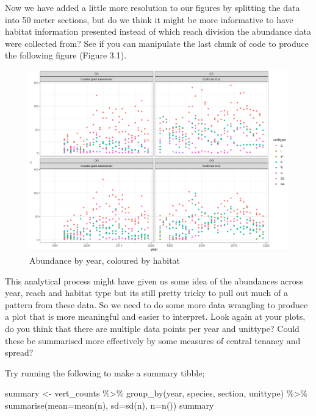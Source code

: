 \documentclass[
]{book}
\newenvironment{Shaded}{\begin{snugshade}}{\end{snugshade}}
\newcommand{\AttributeTok}[1]{\textcolor[rgb]{0.77,0.63,0.00}{#1}}
\newcommand{\FunctionTok}[1]{\textcolor[rgb]{0.00,0.00,0.00}{#1}}
\newcommand{\NormalTok}[1]{#1}
\newcommand{\OtherTok}[1]{\textcolor[rgb]{0.56,0.35,0.01}{#1}}
\newcommand{\SpecialCharTok}[1]{\textcolor[rgb]{0.00,0.00,0.00}{#1}}
\begin{document}
Now we have added a little more resolution to our figures by splitting the data into 50 meter sections, but do we think it might be more informative to have habitat information presented instead of which reach division the abundance data were collected from? See if you can manipulate the last chunk of code to produce the following figure (Figure 3.1).

\begin{figure}
\includegraphics[width=0.9\linewidth]{figures/Screenshot 2023-03-05 at 11.09.31} \caption{Abundance by year, coloured by habitat}\label{fig:unnamed-chunk-13}
\end{figure}

This analytical process might have given us some idea of the abundances across year, reach and habitat type but its still pretty tricky to pull out much of a pattern from these data. So we need to do some more data wrangling to produce a plot that is more meaningful and easier to interpret. Look again at your plots, do you think that there are multiple data points per year and unittype? Could these be summarised more effectively by some measures of central tenancy and spread?

Try running the following to make a summary tibble;

\begin{Shaded}
\begin{Highlighting}[]
\NormalTok{summary }\OtherTok{\textless{}{-}}\NormalTok{ vert\_counts }\SpecialCharTok{\%\textgreater{}\%}
  \FunctionTok{group\_by}\NormalTok{(year, species, section, unittype) }\SpecialCharTok{\%\textgreater{}\%} 
  \FunctionTok{summarise}\NormalTok{(}\AttributeTok{mean=}\FunctionTok{mean}\NormalTok{(n),}
            \AttributeTok{sd=}\FunctionTok{sd}\NormalTok{(n),}
            \AttributeTok{n=}\FunctionTok{n}\NormalTok{())}
\NormalTok{summary}
\end{Highlighting}
\end{Shaded}
\end{document}
